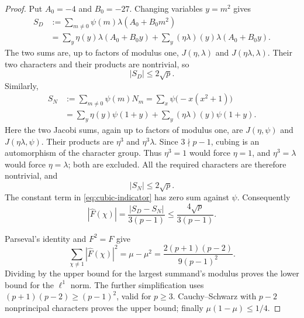 \documentclass[11pt]{article}
\theoremstyle{definition}
\theoremstyle{remark}
\begin{document}
\begin{proof}
Put $A_0=-4$ and $B_0=-27$.  Changing variables $y=m^2$ gives
\begin{align*}
 S_D&:=\sum_{m\ne0}\psi(m)\lambda(A_0+B_0m^2)\\
 &=\sum_y\eta(y)\lambda(A_0+B_0y)
   +\sum_y(\eta\lambda)(y)\lambda(A_0+B_0y).
\end{align*}
The two sums are, up to factors of modulus one,
$J(\eta,\lambda)$ and $J(\eta\lambda,\lambda)$.
Their two characters and their products are nontrivial, so
\[
 |S_D|\le2\sqrt p.
\]
Similarly,
\begin{align*}
 S_N&:=\sum_{m\ne0}\psi(m)N_m
     =\sum_x\psi\bigl(-x(x^2+1)\bigr)\\
 &=\sum_y\eta(y)\psi(1+y)
   +\sum_y(\eta\lambda)(y)\psi(1+y).
\end{align*}
Here the two Jacobi sums, again up to factors of modulus one,
are $J(\eta,\psi)$ and $J(\eta\lambda,\psi)$.
Their products are $\eta^3$ and $\eta^3\lambda$.
Since $3\nmid p-1$, cubing is an automorphism of the character
group.  Thus $\eta^3=1$ would force $\eta=1$, and
$\eta^3=\lambda$ would force $\eta=\lambda$; both are excluded.
All the required characters are therefore nontrivial, and
\[
 |S_N|\le2\sqrt p.
\]
The constant term in \eqref{eq:cubic-indicator} has zero sum
against $\psi$.  Consequently
\[
 |\widehat F(\chi)|
   =\frac{|S_D-S_N|}{3(p-1)}
   \le\frac{4\sqrt p}{3(p-1)}.
\]

Parseval's identity and $F^2=F$ give
\[
 \sum_{\chi\ne1}|\widehat F(\chi)|^2
   =\mu-\mu^2
   =\frac{2(p+1)(p-2)}{9(p-1)^2}.
\]
Dividing by the upper bound for the largest summand's modulus
proves the lower bound for the $\ell^1$ norm.  The further
simplification uses
$(p+1)(p-2)\ge(p-1)^2$, valid for $p\ge3$.
Cauchy--Schwarz with $p-2$ nonprincipal characters proves the
upper bound; finally $\mu(1-\mu)\le1/4$.
\end{proof}
\end{document}
